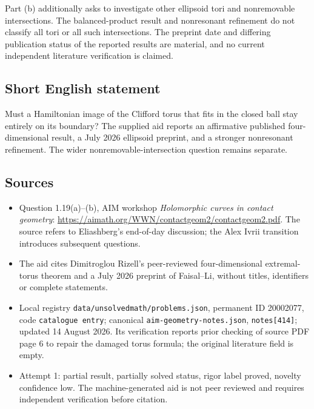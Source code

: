 \documentclass[11pt]{article}
\begin{document}
Part (b) additionally asks to investigate other ellipsoid tori and nonremovable intersections. The balanced-product result and nonresonant refinement do not classify all tori or all such intersections. The preprint date and differing publication status of the reported results are material, and no current independent literature verification is claimed.
\subsection{Short English statement}
Must a Hamiltonian image of the Clifford torus that fits in the closed ball stay entirely on its boundary? The supplied aid reports an affirmative published four-dimensional result, a July 2026 ellipsoid preprint, and a stronger nonresonant refinement. The wider nonremovable-intersection question remains separate.
\subsection{Sources}
\begin{itemize}
\item Question 1.19(a)--(b), AIM workshop \emph{Holomorphic curves in contact geometry}: \url{https://aimath.org/WWN/contactgeom2/contactgeom2.pdf}. The source refers to Eliashberg's end-of-day discussion; the Alex Ivrii transition introduces subsequent questions.
\item The aid cites Dimitroglou Rizell's peer-reviewed four-dimensional extremal-torus theorem and a July 2026 preprint of Faisal--Li, without titles, identifiers or complete statements.
\item Local registry \texttt{data/unsolvedmath/problems.json}, permanent ID 20002077, code \texttt{catalogue entry}; canonical \texttt{aim-geometry-notes.json}, \texttt{notes[414]}; updated 14 August 2026. Its verification reports prior checking of source PDF page 6 to repair the damaged torus formula; the original literature field is empty.
\item Attempt 1: partial result, partially solved status, rigor label proved, novelty confidence low. The machine-generated aid is not peer reviewed and requires independent verification before citation.
\end{itemize}
\end{document}
